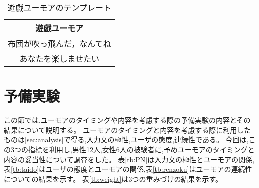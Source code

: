 \begin{table}
\begin{center}
\caption{遊戯ユーモアのテンプレート}
\label{tb:gametemp}
\begin{tabular}{|c|}
\hline
遊戯ユーモア \\
\hline\hline
布団が吹っ飛んだ，なんてね \\
\hline
あなたを楽しませたい \\
\hline
\end{tabular}
\end{center}
\end{table}




\section{予備実験}\label{sec:pre}
この節では,ユーモアのタイミングや内容を考慮する際の予備実験の内容とその結果について説明する。
ユーモアのタイミングと内容を考慮する際に利用したものは\ref{sec:analysis}で得る,入力文の極性,ユーザの態度,連続性である。
今回は,この3つの指標を利用し,男性12人,女性6人の被験者に,予めユーモアのタイミングと内容の妥当性について調査をした。
表\ref{tb:PN}は入力文の極性とユーモアの関係,表\ref{tb:taido}はユーザの態度とユーモアの関係,表\ref{tb:renzoku}はユーモアの連続性についての結果を示す。
表\ref{tb:weight}は3つの重みづけの結果を示す。




